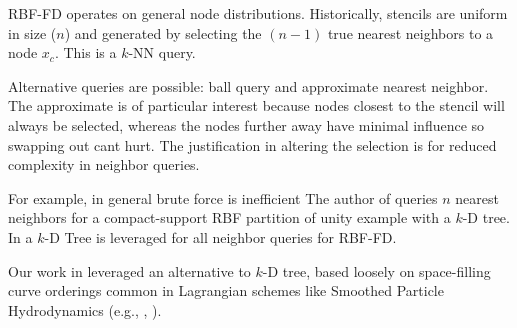\documentclass[11pt]{report}
\begin{document}
{RBF-FD operates on general node distributions. Historically, stencils are uniform in size ($n$) and generated by selecting the $(n-1)$ true nearest neighbors to a node $x_c$. This is a $k$-NN query. 

Alternative queries are possible: ball query and approximate nearest neighbor. The approximate is of particular interest because nodes closest to the stencil will always be selected, whereas the nodes further away have minimal influence so swapping out cant hurt. The justification in altering the selection is for reduced complexity in neighbor queries.  





For example, in general brute force is inefficient 
The author of \cite{Fasshauer2007} queries $n$ nearest neighbors for a compact-support RBF partition of unity example with a $k$-D tree. In \cite{FlyerLehto11,FornbergLehto11} a $k$-D Tree is leveraged for all neighbor queries for RBF-FD. 

Our work in \cite{BolligFlyerErlebacher2012} leveraged an alternative to $k$-D tree, based loosely on space-filling curve orderings common in Lagrangian schemes like Smoothed Particle Hydrodynamics (e.g., \cite{IanThesis}, \cite{Kelager}). %

}
\end{document}
